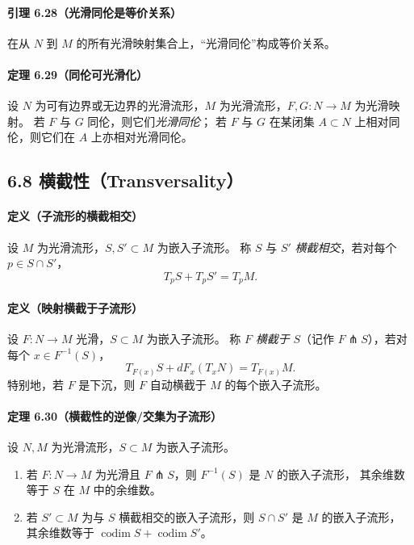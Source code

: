 \documentclass[11pt,a4paper]{article}
\begin{document}
\paragraph{引理 6.28（光滑同伦是等价关系）}
在从 $N$ 到 $M$ 的所有光滑映射集合上，“光滑同伦”构成等价关系。

\paragraph{定理 6.29（同伦可光滑化）}
设 $N$ 为可有边界或无边界的光滑流形，$M$ 为光滑流形，$F,G:N\to M$ 为光滑映射。
若 $F$ 与 $G$ 同伦，则它们\emph{光滑同伦}；
若 $F$ 与 $G$ 在某闭集 $A\subset N$ 上相对同伦，则它们在 $A$ 上亦相对光滑同伦。

\subsection*{6.8 横截性（Transversality）}

\paragraph{定义（子流形的横截相交）}
设 $M$ 为光滑流形，$S,S'\subset M$ 为嵌入子流形。
称 $S$ 与 $S'$ \emph{横截相交}，若对每个 $p\in S\cap S'$，
\[
T_pS + T_pS' = T_pM.
\]

\paragraph{定义（映射横截于子流形）}
设 $F:N\to M$ 光滑，$S\subset M$ 为嵌入子流形。
称 $F$ \emph{横截于} $S$（记作 $F\pitchfork S$），若对每个 $x\in F^{-1}(S)$，
\[
T_{F(x)}S + dF_x(T_xN) = T_{F(x)}M.
\]
特别地，若 $F$ 是下沉，则 $F$ 自动横截于 $M$ 的每个嵌入子流形。

\paragraph{定理 6.30（横截性的逆像/交集为子流形）}
设 $N,M$ 为光滑流形，$S\subset M$ 为嵌入子流形。
\begin{enumerate}
\item[(a)] 若 $F:N\to M$ 为光滑且 $F\pitchfork S$，则 $F^{-1}(S)$ 是 $N$ 的嵌入子流形，
其余维数等于 $S$ 在 $M$ 中的余维数。
\item[(b)] 若 $S'\subset M$ 为与 $S$ 横截相交的嵌入子流形，则 $S\cap S'$ 是 $M$ 的嵌入子流形，
其余维数等于 $\operatorname{codim}S+\operatorname{codim}S'$。
\end{enumerate}
\end{document}
